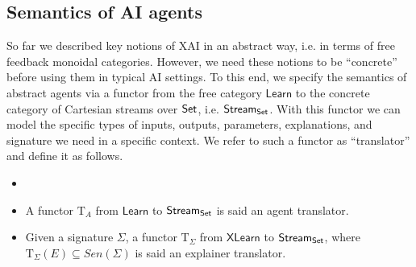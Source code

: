 




\subsection{Semantics of AI agents}
\label{sec:interpretation}
So far we described key notions of XAI in an abstract way, i.e. in terms of free feedback monoidal categories. However, we need these notions to be ``concrete'' before using them in typical AI settings. To this end, we specify the semantics of abstract agents via a functor from the free category $\mathsf{Learn}$ to the concrete category of Cartesian streams over \(\mathsf{Set}\), i.e. \(\mathsf{Stream}_{\mathsf{Set}}\). With this functor we can model the specific types of inputs, outputs, parameters, explanations, and signature we need in a specific context. We refer to such a functor as ``translator'' and define it as follows.
\begin{definition}[Translator]

\begin{itemize}
\item[]
    \item A functor \textbf{$\mathrm{T}_A$} from $\mathsf{Learn}$ to \(\mathsf{Stream}_{\mathsf{Set}}\) is said an agent translator.
    \item Given a signature $\Sigma$, a functor $\mathrm{T}_{\Sigma}$ from $\mathsf{XLearn}$ to \(\mathsf{Stream}_{\mathsf{Set}}\), where $\mathrm{T}_{\Sigma}(E)\subseteq Sen(\Sigma)$ is said an explainer translator.
\end{itemize}
\end{definition}

